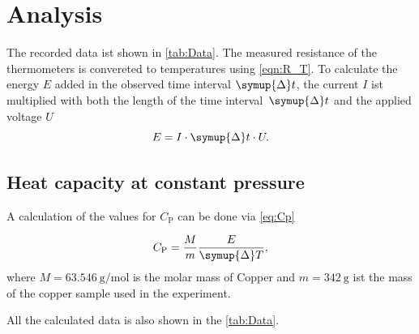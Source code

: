 \section{Analysis}
\label{sec:Analysis}

The recorded data ist shown in \autoref{tab:Data}. The measured resistance of the thermometers is convereted to temperatures using \autoref{eqn:R_T}.
To calculate the energy $E$ added in the observed time interval $\symup{\Delta}t$, the current $I$ ist multiplied with both the length of the time 
interval~$\symup{\Delta}t$ and the applied voltage $U$
\begin{equation}
  E = I \cdot \symup{\Delta}t \cdot U.
  \label{eq:added_E}
\end{equation}

\subsection{Heat capacity at constant pressure}
\label{subsec:Heat capacity at constant volume}
A calculation of the values for $C_\mathrm{P}$ can be done via \autoref{eq:Cp}

\begin{equation}
  C_\mathrm{P} = \frac{M}{m} \frac{E}{\symup{\Delta}T},
  \label{eq:C_P_calc}
\end{equation}
where $M=\qty{63.546}{\gram\per\mol}$ is the molar mass of Copper and $m=\qty{342}{\gram}$ ist the mass of the copper sample used in the
experiment. 

All the calculated data is also shown in the \autoref{tab:Data}.

